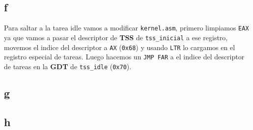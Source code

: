 \subsection{f}
Para saltar a la tarea idle vamos a modificar \texttt{kernel.asm}, primero limpiamos \texttt{EAX} ya que vamos a pasar el descriptor de \textbf{TSS} de \texttt{tss\_inicial} a ese registro, movemos el indice del descriptor a \texttt{AX} (\texttt{0x68}) y usando \texttt{LTR} lo cargamos en el registro especial de tareas. Luego hacemos un \texttt{JMP FAR} a el indice del descriptor de tareas en la \textbf{GDT} de \texttt{tss\_idle} (\texttt{0x70}).

\subsection{g}


\subsection{h}
